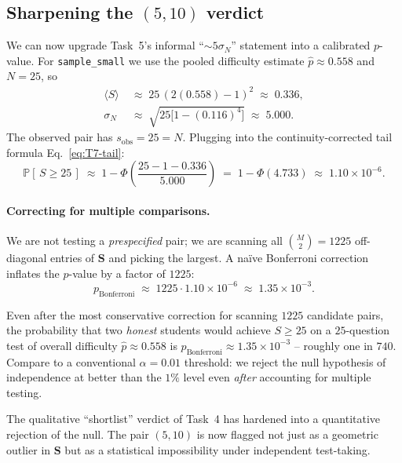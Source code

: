 \documentclass[11pt,a4paper]{article}
\newcommand{\Sm}{\bm{S}}
\renewcommand{\Pr}{\mathbb{P}}
\begin{document}
\subsection{Sharpening the $(5,10)$ verdict}
\label{sec:T7-510}
We can now upgrade Task~5's informal ``$\sim 5\sigma_N$'' statement
into a calibrated $p$-value. For \texttt{sample\_small} we use the
pooled difficulty estimate $\hat p \approx 0.558$ and $N=25$, so
\begin{align}
  \langle S\rangle  &\;\approx\; 25\,(2(0.558)-1)^2 \;\approx\; 0.336,\\
  \sigma_N          &\;\approx\; \sqrt{25\bigl[1-(0.116)^4\bigr]}
                      \;\approx\; 5.000.
\end{align}
The observed pair has $s_{\text{obs}} = 25 = N$. Plugging into the
continuity-corrected tail formula Eq.~\eqref{eq:T7-tail}:
\begin{equation}
  \Pr[\,S \geq 25\,]
  \;\approx\;
  1 - \Phi\!\left(\frac{25 - 1 - 0.336}{5.000}\right)
  \;=\; 1 - \Phi(4.733)
  \;\approx\; 1.10\times 10^{-6}.
  \label{eq:pval-510}
\end{equation}

\paragraph{Correcting for multiple comparisons.} We are not testing a
\emph{prespecified} pair; we are scanning all $\binom{M}{2} = 1225$
off-diagonal entries of $\Sm$ and picking the largest. A na\"ive
Bonferroni correction inflates the $p$-value by a factor of $1225$:
\begin{equation}
  p_{\text{Bonferroni}}
  \;\approx\; 1225 \cdot 1.10\times 10^{-6}
  \;\approx\; 1.35\times 10^{-3}.
  \label{eq:bonf}
\end{equation}

\begin{keyresult}
Even after the most conservative correction for scanning $1225$
candidate pairs, the probability that two \emph{honest} students would
achieve $S \geq 25$ on a $25$-question test of overall difficulty
$\hat p \approx 0.558$ is
$p_{\text{Bonferroni}} \approx 1.35\times 10^{-3}$ -- roughly one in
$740$. Compare to a conventional $\alpha = 0.01$ threshold: we reject
the null hypothesis of independence at better than the $1\%$ level
even \emph{after} accounting for multiple testing.
\end{keyresult}

The qualitative ``shortlist'' verdict of Task~4 has hardened into a
quantitative rejection of the null. The pair $(5,10)$ is now flagged
not just as a geometric outlier in $\Sm$ but as a statistical
impossibility under independent test-taking.
\end{document}
